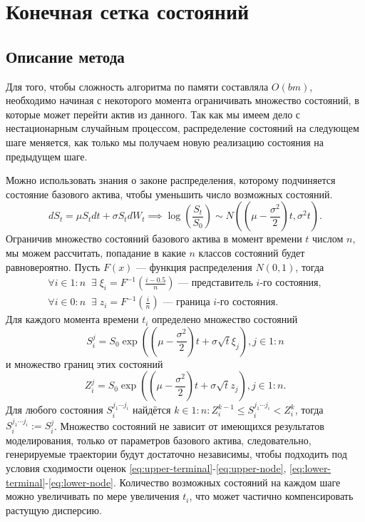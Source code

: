 \section{Конечная сетка состояний}
	    \subsection{Описание метода}
	        Для того, чтобы сложность алгоритма по  памяти составляла $O(bm)$, необходимо начиная с некоторого момента ограничивать множество состояний, в которые может перейти актив из данного. Так как мы имеем дело с нестационарным случайным процессом, распределение состояний на следующем шаге меняется, как только мы получаем новую реализацию состояния на предыдущем шаге.

	        Можно использовать знания о законе распределения, которому подчиняется состояние базового актива, чтобы уменьшить число возможных состояний.
	        $$dS_t = \mu S_t dt + \sigma S_t dW_t \implies \log \left(\frac{S_t}{S_0}\right)\sim N\left(\left(\mu - \frac{\sigma^2}{2}\right)t, \sigma^2 t\right).$$
	        Ограничив множество состояний базового актива в момент времени $t$ числом $n$, мы можем рассчитать, попадание в какие $n$ классов состояний будет равновероятно. Пусть $F(x)$ --- функция распределения $N\left(0, 1\right)$, тогда
	        \begin{align}
	            \forall i \in 1:n \;\;\exists\; \xi_i = F^{-1}\left(\frac{i-0.5}{n}\right) \text{ --- представитель $i$-го состояния} ,\\
	            \forall i \in 0:n \;\;\exists\; z_i = F^{-1}\left(\frac{i}{n}\right) \text{ --- граница $i$-го состояния} .
	        \end{align}
	        Для каждого момента времени $t_i$ определено множество состояний $$S_i^j = S_0\exp\left(\left(\mu - \frac{\sigma^2}{2}\right)t + \sigma \sqrt{t}\xi_j\right), j\in 1:n$$ и множество границ этих состояний $$Z_i^j = S_0\exp\left(\left(\mu - \frac{\sigma^2}{2}\right)t + \sigma \sqrt{t}z_j\right), j\in 1:n.$$
	        Для любого состояния $S_i^{j_1\cdots j_i}$ найдётся $k\in 1:n : Z_i^{k-1} \leq S_i^{j_1\cdots j_i} < Z_i^k$, тогда $S_i^{j_1\cdots j_i} := S_i^j$.
	        Множество состояний не зависит от имеющихся результатов моделирования, только от параметров базового актива, следовательно, генерируемые траектории будут достаточно независимы, чтобы подходить под условия сходимости оценок \eqref{eq:upper-terminal}-\eqref{eq:upper-node}, \eqref{eq:lower-terminal}-\eqref{eq:lower-node}. Количество возможных состояний на каждом шаге можно увеличивать по мере увеличения $t_i$, что может частично компенсировать растущую дисперсию.
